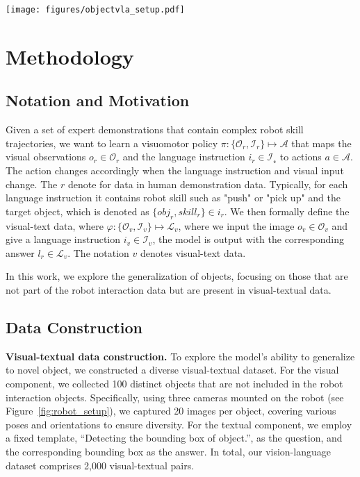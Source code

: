 \begin{figure*}[t]
    \centering
    \texttt{[image: figures/objectvla\_setup.pdf]}
    \caption{\textbf{Robot setup and examples for real-world manipulation tasks.} We evaluate ObjectVLA with 4 skills on a Franka robot arm equipped with two external Zed cameras and a Realsense 435i wrist camera.}\label{fig:robot_setup}
\end{figure*}




\section{Methodology}
\subsection{Notation and Motivation}
Given a set of expert demonstrations that contain complex robot skill trajectories, we want to learn a visuomotor policy $\pi : \{\mathcal{O}_{r}, \mathcal{I}_{r}\} \mapsto \mathcal{A}$ that maps the visual observations $o_{r} \in \mathcal{O}_{r}$ and the language instruction $i_{r} \in \mathcal{I_{r}}$ to actions $a \in \mathcal{A}$. The action changes accordingly when the language instruction and visual input change. The $r$ denote for data in human demonstration data. Typically, for each language instruction it contains robot skill such as "push" or "pick up" and the target object, which is denoted as $\{obj_{r}, skill_{r}\} \in i_{r}$. We then formally define the visual-text data, where $\varphi : \{\mathcal{O}_{v}, \mathcal{I}_{v}\} \mapsto \mathcal{L}_{v}$, where we input the image $o_{v} \in \mathcal{O}_{v}$ and give a language instruction $i_{v} \in \mathcal{I}_{v}$, the model is output with the corresponding answer $l_{r} \in \mathcal{L}_{v}$. The notation $v$ denotes visual-text data.

In this work, we explore the generalization of objects, focusing on those that are not part of the robot interaction data but are present in visual-textual data.

\subsection{Data Construction}


\textbf{Visual-textual data construction.} To explore the model's ability to generalize to novel object, we constructed a diverse visual-textual dataset. For the visual component, we collected 100 distinct objects that are not included in the robot interaction objects. Specifically, using three cameras mounted on the robot (see Figure~\ref{fig:robot_setup}), we captured 20 images per object, covering various poses and orientations to ensure diversity. For the textual component, we employ a fixed template, ``Detecting the bounding box of object.'', as the question, and the corresponding bounding box as the answer. In total, our vision-language dataset comprises 2,000 visual-textual pairs.

